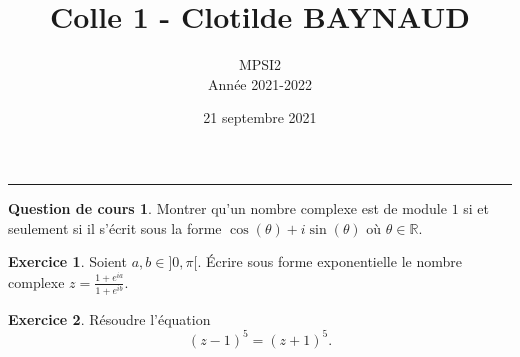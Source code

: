 \documentclass[a4paper, 11pt,openany]{article}%
\title{Colle 1 - Clotilde BAYNAUD}
\author{MPSI2\\
Année 2021-2022}
\date{21 septembre 2021}
\theoremstyle{plain}
\theoremstyle{definition}
\newtheorem{cours}{Question de cours}
\newtheorem{exo}{Exercice}
\newtheorem{sol}{Solution de l'exercice}
\theoremstyle{remark}
\newcommand{\R}{\mathbb{R}}
\begin{document}
   \maketitle
      \rule{\linewidth}{0.5mm}


\begin{cours}
Montrer qu'un nombre complexe est de module $1$ si et seulement si il s'écrit sous la forme $\cos(\theta) + i \sin(\theta)$ où $\theta \in \R$.
\end{cours}


\begin{exo}
Soient $a,b \in ]0, \pi[$. Écrire sous forme exponentielle le nombre complexe $z = \frac{1+e^{ia}}{1+e^{ib}}$.
\end{exo}




\begin{exo}
Résoudre l'équation
\[ (z-1)^5 = (z+1)^5.\]
\end{exo}

\end{document}
